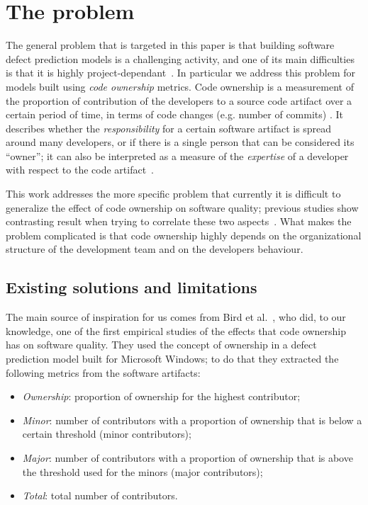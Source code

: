 
\section{The problem}
\label{sec:prob}

The general problem that is targeted in this paper is that building software defect prediction models is a challenging activity, and one of its main difficulties is that it is highly project-dependant~\cite{zimmermann2009cross-project}.
In particular we address this problem for models built using \textit{code ownership} metrics. Code ownership is a measurement of the proportion of contribution of the developers to a source code artifact over a certain period of time, in terms of code changes (e.g. number of commits) \cite{Greiler:replication}. It describes whether the \textit{responsibility} for a certain software artifact is spread around many developers, or if there is a single person that can be considered its ``owner'';  it can also be interpreted as a measure of the \textit{expertise} of a developer with respect to the code artifact~\cite{bird:original}.


This work addresses the more specific problem that currently it is difficult to generalize the effect of code ownership on software quality; previous studies show contrasting result when trying to correlate these two aspects~\cite{bird:original, Foucault:oss, Greiler:replication}. What makes the problem complicated is that code ownership highly depends on the organizational structure of the development team and on the developers behaviour.

\subsection{Existing solutions and limitations}
\label{sec:existing_solutions}
The main source of inspiration for us comes from Bird et
al.~\cite{bird:original}, who did, to our knowledge, one of the first empirical studies of the effects that code ownership has on software quality. They used the concept of ownership in a defect prediction model built for Microsoft Windows; to do that they extracted the following metrics from the software artifacts: 
\begin{itemize}
\item \textit{Ownership}: proportion of ownership for the highest contributor;
\item \textit{Minor}: number of contributors with a proportion of ownership that is below a certain threshold (minor contributors);
\item \textit{Major}: number of contributors with a proportion of ownership that is above the threshold used for the minors (major contributors);
\item \textit{Total}: total number of contributors.
\end{itemize}

